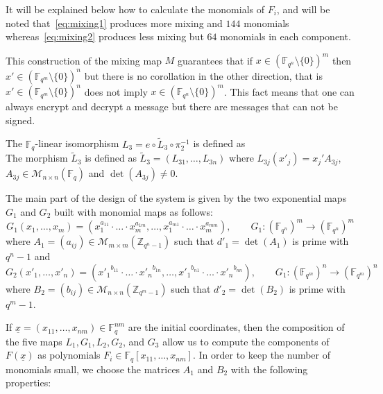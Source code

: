 \documentclass[12pt,a4paper]{amsart}
\theoremstyle{remark}
\theoremstyle{definition}
\newcommand\gfq{\mathbb{F}_q}
\begin{document}
It will be explained below how to calculate the monomials of $F_i$, and will be noted that~\eqref{eq:mixing1} 
produces more mixing and $144$ monomials whereas~\eqref{eq:mixing2} produces less mixing but $64$ monomials in each component.

This construction of the mixing map $M$ guarantees that if $x\in ({\mathbb{F}}_{q^n}\setminus  \{0\} )^m$   then 
$x' \in ({\mathbb{F}}_{q^m}\setminus  \{0\} )^n$ but there is no corollation in the other direction, 
that is $x' \in ({\mathbb{F}}_{q^m}\setminus  \{0\} )^n$ does not imply  
$x\in ({\mathbb{F}}_{q^n}\setminus  \{0\} )^m$. 
This fact means that one can always encrypt and decrypt a 
message but there are messages that can not be signed.

The $\mathbb{F}_q$-linear isomorphism $L_3=e \circ\tilde{L}_3\circ\pi_2^{-1}$ is defined as
\begin{equation}
\label{eq:diagrama5}

\end{equation}
The morphism $\tilde{L}_3$ is defined as $\tilde{L}_3=(L_{31},\dots,L_{3n})$ where
$L_{3j}(x'_j)=x_j' A_{3j}$, $A_{3j}\in\mathscr{M}_{n\times n}(\gfq)$ and
$\det(A_{3j})\neq 0$.

The main part of the design of the system is given by the two exponential maps
$G_1$ and $G_2$ built with monomial maps as follows:
\[
G_1(x_1,\dots,x_m)=(x_1^{a_{11}}\cdot\ldots\cdot x_m^{a_{1m}},\dots,x_1^{a_{m1}}\cdot\ldots\cdot x_m^{a_{mm}}),\qquad 
G_1:(\mathbb{F}_{q^n})^m\to(\mathbb{F}_{q^n})^m
\]
where $A_1=(a_{ij})\in\mathscr{M}_{m\times m}(\mathbb{Z}_{q^n-1})$ such that $d'_1=\det(A_1)$ is prime with $q^n-1$ and
\[
G_2(x'_1,\dots,x'_n)=({x'_1}^{b_{11}}\cdot\ldots\cdot {x'_n}^{b_{1n}},\dots,{x'_1}^{b_{n1}}\cdot\ldots\cdot {x'_n}^{b_{nn}}),\qquad 
G_1:(\mathbb{F}_{q^m})^n\to(\mathbb{F}_{q^m})^n
\]
where $B_2=(b_{ij})\in\mathscr{M}_{n\times n}(\mathbb{Z}_{q^m-1})$ such that $d'_2=\det(B_2)$ is prime with $q^m-1$.

If $\underline{x}=(x_{11},\dots,x_{nm})\in\gfq^{nm}$ are the initial coordinates, then
the composition of the five maps $L_1,G_1,L_2,G_2$, and $G_3$ allow us to compute 
the components of $F(\underline{x})$ as polynomials 
$F_i\in\mathbb{F}_q[x_{11},\dots,x_{nm}]$. In order to keep the number
of monomials small, we choose the matrices $A_1$ and $B_2$ with the following properties:
\end{document}
